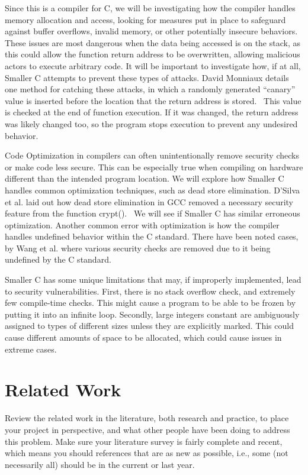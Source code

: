 \documentclass[sigconf, anonymous]{acmart}
\begin{document}
Since this is a compiler for C, we will be investigating how the compiler handles memory allocation and access, looking for measures put in place to safeguard against buffer overflows, invalid memory, or other potentially insecure behaviors. These issues are most dangerous when the data being accessed is on the stack, as this could allow the function return address to be overwritten, allowing malicious actors to execute arbitrary code. It will be important to investigate how, if at all, Smaller C attempts to prevent these types of attacks. David Monniaux details one method for catching these attacks, in which a randomly generated “canary” value is inserted before the location that the return address is stored.~\cite{Monniaux:Memory} This value is checked at the end of function execution. If it was changed, the return address was likely changed too, so the program stops execution to prevent any undesired behavior.

Code Optimization in compilers can often unintentionally remove security checks or make code less secure. This can be especially true when compiling on hardware different than the intended program location. We will explore how Smaller C handles common optimization techniques, such as dead store elimination. D’Silva et al. laid out how dead store elimination in GCC removed a necessary security feature from the function crypt().~\cite{DSilva:Correctness} We will see if Smaller C has similar erroneous optimization. Another common error with optimization is how the compiler handles undefined behavior within the C standard. There have been noted cases, by Wang et al. where various security checks are removed due to it being undefined by the C standard.~\cite{Wang:Optimization}


Smaller C has some unique limitations that may, if improperly implemented, lead to security vulnerabilities. First, there is no stack overflow check, and extremely few compile-time checks. This might cause a program to be able to be frozen by putting it into an infinite loop. Secondly, large integers constant are ambiguously assigned to types of different sizes unless they are explicitly marked. This could cause different amounts of space to be allocated, which could cause issues in extreme cases.

\section{Related Work}
\label{related work}

Review the related work in the literature, both research and practice,
to place your project in perspective, and what other people have been
doing to address this problem. Make sure your literature survey is
fairly complete and recent, which means you should references that are
as new as possible, i.e., some (not necessarily all) should be in the
current or last year.
\end{document}
